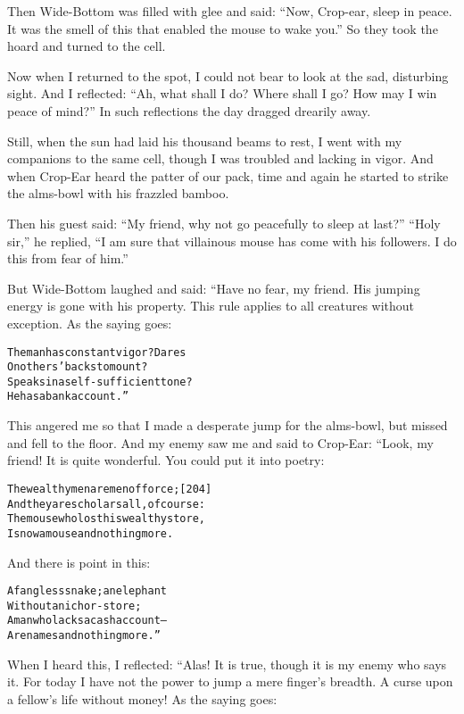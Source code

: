 \documentclass{article}
\renewenvironment{verbatim}{\begin{alltt}\normalfont\begin{centering}}{\end{centering}\end{alltt}}
\begin{document}
Then Wide-Bottom was filled with glee and said:
``Now, Crop-ear, sleep in peace. It was the smell of this that enabled the mouse to wake you.''
So they took the hoard and turned to the cell.

Now when I returned to the spot, I could not bear to look at the
sad, disturbing sight. And I reflected:
``Ah, what shall I do? Where shall I go? How may I win peace of mind?''
In such reflections the day dragged drearily away.

Still, when the sun had laid his thousand beams to rest, I went
with my companions to the same cell, though I was troubled and
lacking in vigor. And when Crop-Ear heard the patter of our pack,
time and again he started to strike the alms-bowl with his frazzled
bamboo.

Then his guest said:
``My friend, why not go peacefully to sleep at last?''
``Holy sir,'' he replied,
``I am sure that villainous mouse has come with his followers. I do this from fear of him.''

But Wide-Bottom laughed and said: “Have no fear, my friend. His
jumping energy is gone with his property. This rule applies to all
creatures without exception. As the saying goes:

\begin{verbatim}
The man has constant vigor? Dares
    On others' backs to mount?
Speaks in a self-sufficient tone?
    He has a bank account.”
\end{verbatim}
This angered me so that I made a desperate jump for the alms-bowl,
but missed and fell to the floor. And my enemy saw me and said to
Crop-Ear: “Look, my friend! It is quite wonderful. You could put it
into poetry:

\begin{verbatim}
The wealthy men are men of force;                       [204]
And they are scholars all, of course:
The mouse who lost his wealthy store,
Is now a mouse and nothing more.
\end{verbatim}
And there is point in this:

\begin{verbatim}
A fangless snake; an elephant
Without an ichor-store;
A man who lacks a cash account--
Are names and nothing more.”
\end{verbatim}
When I heard this, I reflected: “Alas! It is true, though it is my
enemy who says it. For today I have not the power to jump a mere
finger's breadth. A curse upon a fellow's life without money! As
the saying goes:
\end{document}
